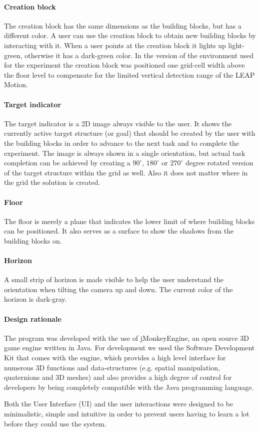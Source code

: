 \paragraph{Creation block}
The creation block has the same dimensions as the building blocks, but has a different color. A user can use the creation block to obtain new building blocks by interacting with it. When a user points at the creation block it lights up light-green, otherwise it has a dark-green color. In the version of the environment used for the experiment the creation block was positioned one grid-cell width above the floor level to compensate for the limited vertical detection range of the LEAP Motion.

\paragraph{Target indicator}
The target indicator is a 2D image always visible to the user. It shows the currently active target structure (or goal) that should be created by the user with the building blocks in order to advance to the next task and to complete the experiment. The image is always shown in a single orientation, but actual task completion can be achieved by creating a $90^{\circ}$, $180^{\circ}$ or $270^{\circ}$ degree rotated version of the target structure within the grid as well. Also it does not matter where in the grid the solution is created.

\paragraph{Floor}
The floor is merely a plane that indicates the lower limit of where building blocks can be positioned. It also serves as a surface to show the shadows from the building blocks on.

\paragraph{Horizon}
A small strip of horizon is made visible to help the user understand the orientation when tilting the camera up and down. The current color of the horizon is dark-gray.



\paragraph{Design rationale}
The program was developed with the use of jMonkeyEngine, an open source 3D game engine written in Java. For development we used the Software Development Kit that comes with the engine, which provides a high level interface for numerous 3D functions and data-structures (e.g. spatial manipulation, quaternions and 3D meshes) and also provides a high degree of control for developers by being completely compatible with the Java programming language. 

Both the User Interface (UI) and the user interactions were designed to be minimalistic, simple and intuitive in order to prevent users having to learn a lot before they could use the system. 
